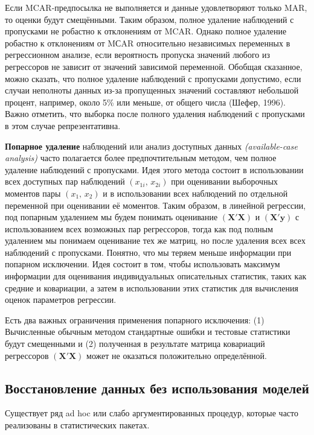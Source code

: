 Если MCAR-предпосылка не выполняется и данные удовлетворяют только MAR, то оценки будут смещёнными. Таким образом, полное удаление наблюдений с пропусками не робастно к отклонениям от MCAR. Однако полное удаление робастно к отклонениям от MСAR относительно независимых 
переменных в регрессионном анализе, если вероятность пропуска значений любого из регрессоров не зависит от значений зависимой переменной. Обобщая сказанное, можно сказать, что полное удаление наблюдений с пропусками допустимо, если случаи неполноты данных из-за пропущенных значений составляют небольшой процент, например, около 5\% или меньше, от общего числа (Шефер, 1996). Важно отметить, что выборка после полного удаления наблюдений с пропусками в этом случае репрезентативна. 


{\bf Попарное удаление} наблюдений  или анализ доступных данных \emph{(available-case analysis)} часто полагается более предпочтительным методом, чем полное удаление наблюдений с пропусками. Идея этого метода состоит в использовании всех доступных пар наблюдений $(x_{1i}, \, x_{2i})$ при оценивании выборочных моментов пары $(x_1, \, x_2)$ и в использовании всех наблюдений по отдельной переменной  при оценивании её моментов. Таким образом, в линейной регрессии, под попарным удалением мы будем понимать оценивание $(\mathbf{X'X})$ и $(\mathbf{X'y})$ с использованием всех возможных пар регрессоров, тогда как под полным удалением мы понимаем оценивание тех же матриц, но после удаления всех всех наблюдений с пропусками. Понятно, что мы теряем меньше информации при попарном исключении. Идея состоит в том, чтобы использовать максимум информации для оценивания индивидуальных описательных статистик, таких как средние и ковариации, а затем в использовании этих статистик для вычисления оценок параметров регрессии.

Есть два важных ограничения применения попарного исключения: (1) Вычисленные обычным методом стандартные ошибки и тестовые статистики будут смещенными и (2) полученная в результате матрица ковариаций регрессоров $(\mathbf{X'X})$ может не оказаться  положительно определённой.

\subsection{Восстановление данных без использования моделей} 

Существует ряд  ad hoc или слабо аргументированных процедур, которые часто реализованы в статистических пакетах.

